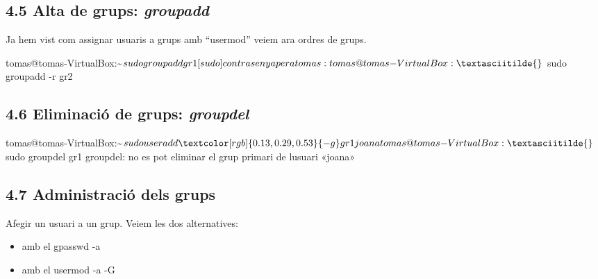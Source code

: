 \documentclass[
  a4paper,
]{article}
\newenvironment{Shaded}{\begin{snugshade}}{\end{snugshade}}
\newcommand{\AttributeTok}[1]{\textcolor[rgb]{0.13,0.29,0.53}{#1}}
\newcommand{\ExtensionTok}[1]{#1}
\newcommand{\NormalTok}[1]{#1}
\newcommand{\StringTok}[1]{\textcolor[rgb]{0.31,0.60,0.02}{#1}}
\begin{document}
\subsection{\texorpdfstring{4.5 Alta de grups:
\emph{groupadd}}{4.5 Alta de grups: groupadd}}\label{alta-de-grups-groupadd}

Ja hem vist com assignar usuaris a grups amb ``usermod'' veiem ara
ordres de grups.

\begin{Shaded}
\begin{Highlighting}[]
\ExtensionTok{tomas@tomas{-}VirtualBox:\textasciitilde{}$}\NormalTok{ sudo groupadd gr1}
\ExtensionTok{[sudo]}\NormalTok{ contrasenya per a tomas: }
\ExtensionTok{tomas@tomas{-}VirtualBox:\textasciitilde{}$}\NormalTok{ sudo groupadd }\AttributeTok{{-}r}\NormalTok{ gr2}
\end{Highlighting}
\end{Shaded}

\subsection{\texorpdfstring{4.6 Eliminació de grups:
\emph{groupdel}}{4.6 Eliminació de grups: groupdel}}\label{eliminaciuxf3-de-grups-groupdel}

\begin{Shaded}
\begin{Highlighting}[]
\ExtensionTok{tomas@tomas{-}VirtualBox:\textasciitilde{}$}\NormalTok{ sudo useradd  }\AttributeTok{{-}g}\NormalTok{ gr1 joana}
\ExtensionTok{tomas@tomas{-}VirtualBox:\textasciitilde{}$}\NormalTok{ sudo groupdel gr1}
\ExtensionTok{groupdel:}\NormalTok{ no es pot eliminar el grup primari de l}\StringTok{\textquotesingle{}usuari «joana»}
\end{Highlighting}
\end{Shaded}

\subsection{4.7 Administració dels
grups}\label{administraciuxf3-dels-grups}

Afegir un usuari a un grup. Veiem les dos alternatives:

\begin{itemize}
\item
  amb el gpasswd -a
\item
  amb el usermod -a -G
\end{itemize}
\end{document}
